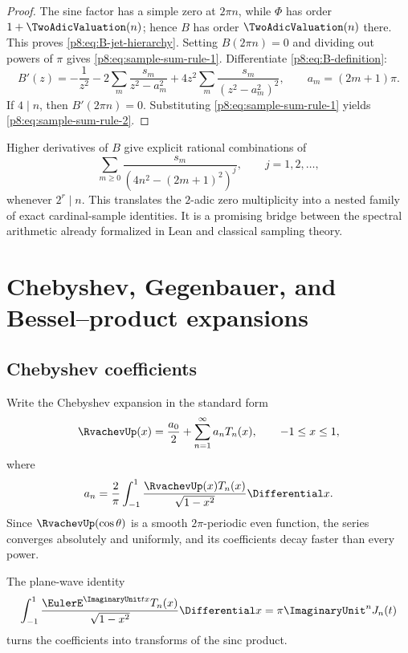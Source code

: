 \documentclass[11pt]{article}
\theoremstyle{definition}
\theoremstyle{remark}
\begin{document}
\begin{proof}
The sine factor has a simple zero at $2\pi n$, while $\Phi$ has order
$1+\TwoAdicValuation(n)$; hence $B$ has order $\TwoAdicValuation(n)$ there.  This proves
\eqref{p8:eq:B-jet-hierarchy}.  Setting $B(2\pi n)=0$ and dividing out powers of
$\pi$ gives \eqref{p8:eq:sample-sum-rule-1}.  Differentiate
\eqref{p8:eq:B-definition}:
\[
 B'(z)=-\frac1{z^2}
 -2\sum_m\frac{s_m}{z^2-a_m^2}
 +4z^2\sum_m\frac{s_m}{(z^2-a_m^2)^2},
 \qquad a_m=(2m+1)\pi.
\]
If $4\mid n$, then $B'(2\pi n)=0$.  Substituting
\eqref{p8:eq:sample-sum-rule-1} yields \eqref{p8:eq:sample-sum-rule-2}.
\end{proof}

Higher derivatives of $B$ give explicit rational combinations of
\[
 \sum_{m\ge0}\frac{s_m}
 {(4n^2-(2m+1)^2)^j},\qquad j=1,2,\ldots,                \label{p8:eq:sample-hierarchy-sums}
\]
whenever $2^r\mid n$.  This translates the $2$-adic zero multiplicity into a
nested family of exact cardinal-sample identities.  It is a promising bridge
between the spectral arithmetic already formalized in Lean and classical
sampling theory.

\section{Chebyshev, Gegenbauer, and Bessel--product expansions}
\label{p8:sec:bessel}

\subsection{Chebyshev coefficients}

Write the Chebyshev expansion in the standard form
\begin{equation}
 \RvachevUp(x)=\frac{a_0}{2}+\sum_{n=1}^\infty a_nT_n(x),
 \qquad -1\le x\le1,                                    \label{p8:eq:chebyshev-series}
\end{equation}
where
\begin{equation}
 a_n=\frac2\pi\int_{-1}^{1}
 \frac{\RvachevUp(x)T_n(x)}{\sqrt{1-x^2}}\Differential x.                \label{p8:eq:chebyshev-coeff}
\end{equation}
Since $\RvachevUp(\cos\theta)$ is a smooth $2\pi$-periodic even function, the
series converges absolutely and uniformly, and its coefficients decay faster
than every power.

The plane-wave identity
\begin{equation}
 \int_{-1}^{1}\frac{\EulerE^{\ImaginaryUnit tx}T_n(x)}{\sqrt{1-x^2}}\Differential x
 =\pi\ImaginaryUnit^nJ_n(t)                                        \label{p8:eq:cheb-plane-wave}
\end{equation}
turns the coefficients into transforms of the sinc product.
\end{document}

